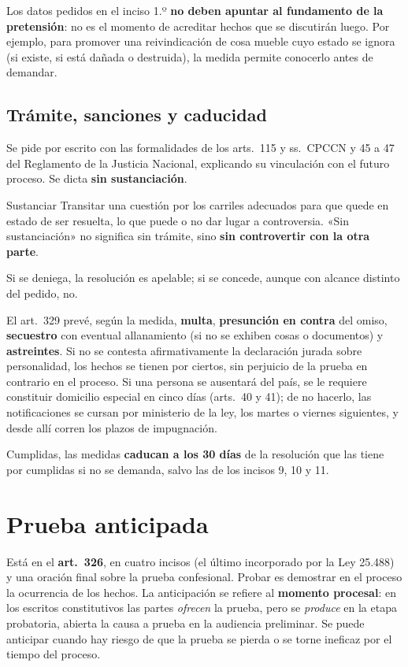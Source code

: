 \documentclass[12pt,oneside]{book}
\begin{document}
Los datos pedidos en el inciso 1.º \textbf{no deben apuntar al fundamento de la pretensión}: no es el momento de acreditar hechos que se discutirán luego. Por ejemplo, para promover una reivindicación de cosa mueble cuyo estado se ignora (si existe, si está dañada o destruida), la medida permite conocerlo antes de demandar.

\subsection{Trámite, sanciones y caducidad}

Se pide por escrito con las formalidades de los arts.~115 y ss.\ CPCCN y 45 a 47 del Reglamento de la Justicia Nacional, explicando su vinculación con el futuro proceso. Se dicta \textbf{sin sustanciación}.

\begin{definition}{Sustanciar}
Transitar una cuestión por los carriles adecuados para que quede en estado de ser resuelta, lo que puede o no dar lugar a controversia. «Sin sustanciación» no significa sin trámite, sino \textbf{sin controvertir con la otra parte}.
\end{definition}

Si se deniega, la resolución es apelable; si se concede, aunque con alcance distinto del pedido, no.

El art.~329 prevé, según la medida, \textbf{multa}, \textbf{presunción en contra} del omiso, \textbf{secuestro} con eventual allanamiento (si no se exhiben cosas o documentos) y \textbf{astreintes}. Si no se contesta afirmativamente la declaración jurada sobre personalidad, los hechos se tienen por ciertos, sin perjuicio de la prueba en contrario en el proceso. Si una persona se ausentará del país, se le requiere constituir domicilio especial en cinco días (arts.~40 y 41); de no hacerlo, las notificaciones se cursan por ministerio de la ley, los martes o viernes siguientes, y desde allí corren los plazos de impugnación.

Cumplidas, las medidas \textbf{caducan a los 30 días} de la resolución que las tiene por cumplidas si no se demanda, salvo las de los incisos 9, 10 y 11.

\section{Prueba anticipada}

Está en el \textbf{art.~326}, en cuatro incisos (el último incorporado por la Ley 25.488) y una oración final sobre la prueba confesional. Probar es demostrar en el proceso la ocurrencia de los hechos. La anticipación se refiere al \textbf{momento procesal}: en los escritos constitutivos las partes \emph{ofrecen} la prueba, pero se \emph{produce} en la etapa probatoria, abierta la causa a prueba en la audiencia preliminar. Se puede anticipar cuando hay riesgo de que la prueba se pierda o se torne ineficaz por el tiempo del proceso.
\end{document}
